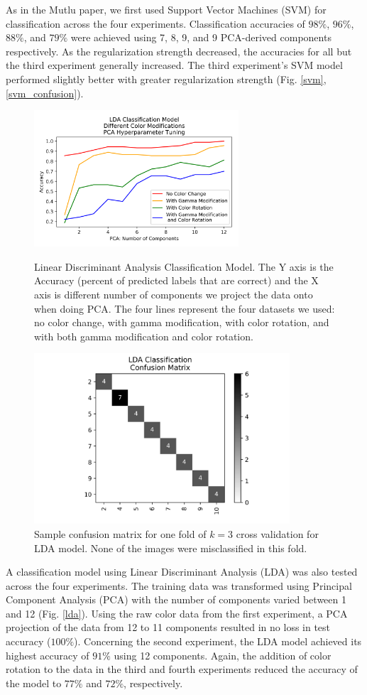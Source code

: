 \documentclass[journal]{IEEEtran}
\begin{document}
As in the Mutlu paper, we first used Support Vector Machines (SVM) for classification across the four experiments. Classification accuracies of $98\%$, $96\%$, $88\%$, and $79\%$ were achieved using 7, 8, 9, and 9 PCA-derived components respectively. As the regularization strength decreased, the accuracies for all but the third experiment generally increased. The third experiment’s SVM model performed slightly better with greater regularization strength (Fig. \ref{svm}, \ref{svm_confusion}).

\begin{figure}
\centering
\includegraphics[height=2in]{LDA/lda_classification.png}
\caption{Linear Discriminant Analysis Classification Model. The Y axis is the Accuracy (percent of predicted labels that are correct) and the X axis is different number of components we project the data onto when doing PCA. The four lines represent the four datasets we used: no color change, with gamma modification, with color rotation, and with both gamma modification and color rotation.}
\label{lda}

\centering
\includegraphics[height=2.5in]{LDA/LDA_classification_cfm.png}
\caption{Sample confusion matrix for one fold of $k=3$ cross validation for LDA model. None of the images were misclassified in this fold.}
\label{lda_confusion}
\end{figure}

A classification model using Linear Discriminant Analysis (LDA) was also tested across the four experiments. The training data was transformed using Principal Component Analysis (PCA) with the number of components varied between 1 and 12 (Fig. \ref{lda}). Using the raw color data from the first experiment, a PCA projection of the data from 12 to 11 components resulted in no loss in test accuracy ($100\%$). Concerning the second experiment, the LDA model achieved its highest accuracy of $91\%$ using 12 components. Again, the addition of color rotation to the data in the third and fourth experiments reduced the accuracy of the model to $77\%$ and $72\%$, respectively.
\end{document}
